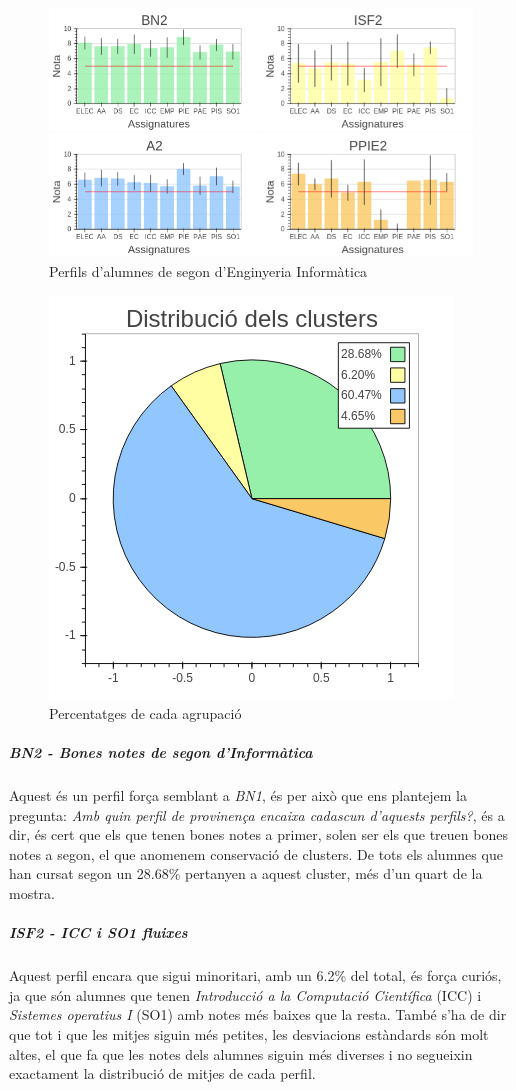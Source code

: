 \documentclass[12pt,a4paper,catalan]{article}
\begin{document}
\begin{figure}[h]
\centering
\includegraphics[width=.9\linewidth]{img/perfils_segon_info.png}
\caption{Perfils d'alumnes de segon d'Enginyeria Informàtica}
\end{figure}

\begin{figure}[h]
\centering
\includegraphics[width=.4\linewidth]{img/perfils_segon_info_pastilla.png}
\caption{Percentatges de cada agrupació}
\end{figure}

\subparagraph{BN2 - Bones notes de segon d'Informàtica}
Aquest és un perfil força semblant a \textit{BN1}, és per això que ens plantejem la pregunta: \textit{Amb quin perfil de provinença encaixa cadascun d'aquests perfils?}, és a dir, és cert que els que tenen bones notes a primer, solen ser els que treuen bones notes a segon, el que anomenem conservació de clusters. De tots els alumnes que han cursat segon un 28.68\% pertanyen a aquest cluster, més d'un quart de la mostra.

\subparagraph{ISF2 - ICC i SO1 fluixes}
Aquest perfil encara que sigui minoritari, amb un 6.2\% del total, és força curiós, ja que són alumnes que tenen \textit{Introducció a la Computació Científica} (ICC) i \textit{Sistemes operatius I} (SO1) amb notes més baixes que la resta. També s'ha de dir que tot i que les mitjes siguin més petites, les desviacions estàndards són molt altes, el que fa que les notes dels alumnes siguin més diverses i no segueixin exactament la distribució de mitjes de cada perfil.
\end{document}

